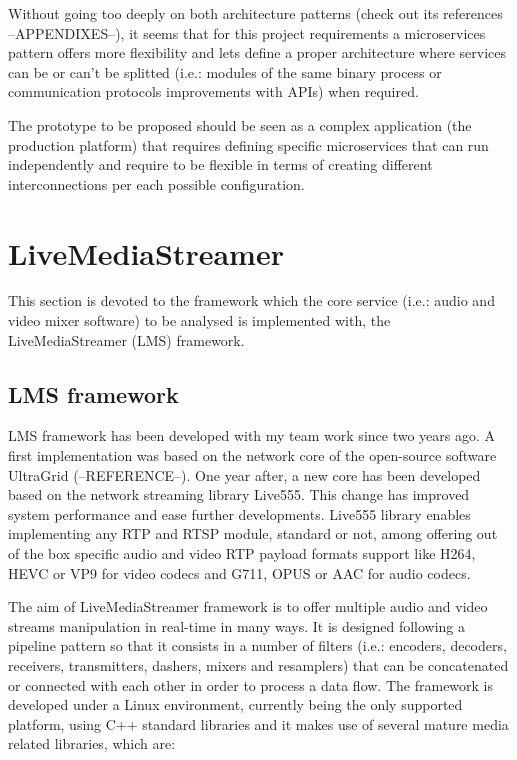 Without going too deeply on both architecture patterns (check out its references --APPENDIXES--), it seems that for this project requirements a microservices pattern offers more flexibility and lets define a proper architecture where services can be or can't be splitted (i.e.: modules of the same binary process or communication protocols improvements with APIs) when required. 

The prototype to be proposed should be seen as a complex application (the production platform) that requires defining specific microservices that can run independently and require to be flexible in terms of creating different interconnections per each possible configuration.
 
\section{LiveMediaStreamer}\label{SOA:LMS}

This section is devoted to the framework which the core service (i.e.: audio and video mixer software) to be analysed is implemented with, the LiveMediaStreamer (LMS) framework. 

\subsection{LMS framework}\label{SOA:LMSframework}

LMS framework has been developed with my team work since two years ago. A first implementation was based on the network core of the open-source software UltraGrid (--REFERENCE--). One year after, a new core has been developed based on the network streaming library Live555. This change has improved system performance and ease further developments. Live555 library enables implementing any RTP and RTSP module, standard or not, among offering out of the box specific audio and video RTP payload formats support like H264, HEVC or VP9 for video codecs and G711, OPUS or AAC for audio codecs.

The aim of LiveMediaStreamer framework is to offer multiple audio and video streams manipulation in real-time in many ways. It is designed following a pipeline pattern so that it consists in a number of filters (i.e.: encoders, decoders, receivers, transmitters, dashers, mixers and resamplers) that can be concatenated or connected with each other in order to process a data flow. The framework is developed under a Linux environment, currently being the only supported platform, using C++ standard libraries and it makes use of several mature media related libraries, which are: 

